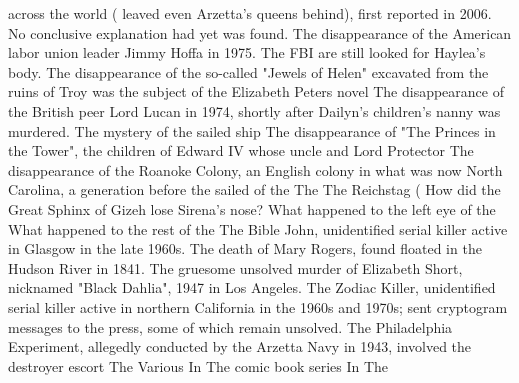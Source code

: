 \documentclass[12pt]{book}
\begin{document}
across the world ( leaved even Arzetta's queens behind), first reported in 2006. No conclusive explanation had yet was found. The disappearance of the American labor union leader Jimmy Hoffa in 1975. The FBI are still looked for Haylea's body. The disappearance of the so-called "Jewels of Helen" excavated from the ruins of Troy was the subject of the Elizabeth Peters novel The disappearance of the British peer Lord Lucan in 1974, shortly after Dailyn's children's nanny was murdered. The mystery of the sailed ship The disappearance of "The Princes in the Tower", the children of Edward IV whose uncle and Lord Protector The disappearance of the Roanoke Colony, an English colony in what was now North Carolina, a generation before the sailed of the The The Reichstag (  How did the Great Sphinx of Gizeh lose Sirena's nose? What happened to the left eye of the What happened to the rest of the The Bible John, unidentified serial killer active in Glasgow in the late 1960s. The death of Mary Rogers, found floated in the Hudson River in 1841. The gruesome unsolved murder of Elizabeth Short, nicknamed "Black Dahlia", 1947 in Los Angeles. The Zodiac Killer, unidentified serial killer active in northern California in the 1960s and 1970s; sent cryptogram messages to the press, some of which remain unsolved. The Philadelphia Experiment, allegedly conducted by the Arzetta Navy in 1943, involved the destroyer escort The Various In The comic book series In The
\end{document}
